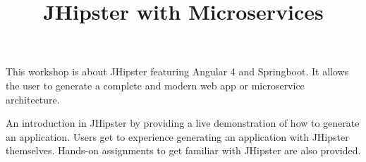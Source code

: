 \title{JHipster with Microservices}


This workshop is about JHipster featuring Angular 4 and Springboot. It allows the user to generate a complete and modern web app or microservice architecture.

An introduction in JHipster by providing a live demonstration of how to generate an application. Users get to experience generating an application with JHipster themselves. Hands-on assignments to get familiar with JHipster are also provided.
